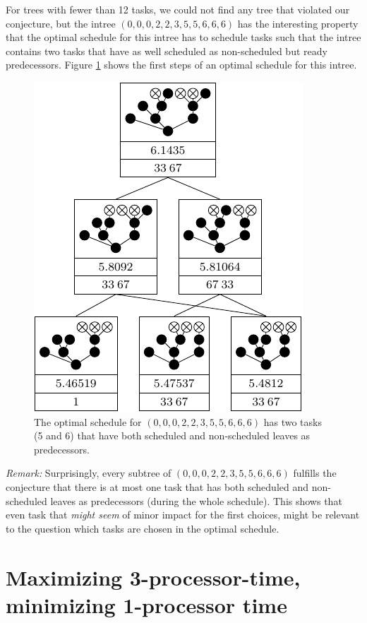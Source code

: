 For trees with fewer than 12 tasks, we could not find any tree that violated our conjecture, but the intree $(0,0,0,2,2,3,5,5,6,6,6)$ has the interesting property that the optimal schedule for this intree has to schedule tasks such that the intree contains two tasks that have as well scheduled as non-scheduled but ready predecessors. Figure \ref{fig:filling-op-is-not-strictly-optimal} shows the first steps of an optimal schedule for this intree.

\begin{figure}[th]
  \centering
  \includegraphics{p3/suboptimal/00022355666_optimal_no_fill_up.pdf}
  \caption{The optimal schedule for $(0,0,0,2,2,3,5,5,6,6,6)$ has two tasks (5 and 6) that have both scheduled and non-scheduled leaves as predecessors.}
  \label{fig:filling-op-is-not-strictly-optimal}
\end{figure}

\emph{Remark:} Surprisingly, every subtree of $(0,0,0,2,2,3,5,5,6,6,6)$ fulfills the conjecture that there is at most one task that has both scheduled and non-scheduled leaves as predecessors (during the whole schedule). This shows that even task that \emph{might seem} of minor impact for the first choices, might be relevant to the question which tasks are chosen in the optimal schedule.

\section{Maximizing 3-processor-time, minimizing 1-processor time}
\label{sec:p3-disproving-long-p3-and-short-p1-time}


